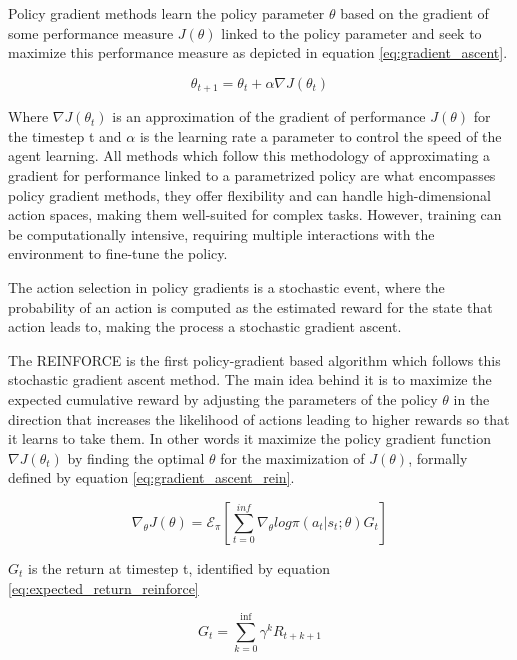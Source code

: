 Policy gradient methods learn the policy parameter $\theta$ based on the gradient of some performance measure $J(\theta)$ linked to the policy parameter and seek to maximize this performance measure as depicted in equation \ref{eq:gradient_ascent}.

\begin{equation}
    \label{eq:gradient_ascent}
    \theta_{t+1} = \theta_t + \alpha \nabla J (\theta_t)
\end{equation}

Where $\nabla J (\theta_t)$ is an approximation of the gradient of performance $J(\theta)$ for the timestep t and $\alpha$ is the learning rate a parameter to control the speed of the agent learning. All methods which follow this methodology of approximating a gradient for performance linked to a parametrized policy are what encompasses policy gradient methods, they offer flexibility and can handle high-dimensional action spaces, making them well-suited for complex tasks. However, training can be computationally intensive, requiring multiple interactions with the environment to fine-tune the policy.

The action selection in policy gradients is a stochastic event, where the probability of an action is computed as the estimated reward for the state that action leads to, making the process a stochastic gradient ascent.

The REINFORCE \cite{sutton} is the first policy-gradient based algorithm which follows this stochastic gradient ascent method. The main idea behind it is to maximize the expected cumulative reward by adjusting the parameters of the policy $\theta$ in the direction that increases the likelihood of actions leading to higher rewards so that it learns to take them. In other words it maximize the policy gradient function $\nabla J (\theta_t)$ by finding the optimal $\theta$ for the maximization of $J(\theta)$, formally defined by equation \ref{eq:gradient_ascent_rein}.

\begin{equation}
    \label{eq:gradient_ascent_rein}
    \nabla_\theta J(\theta) = \mathcal{E}_\pi[\sum_{t=0}^{inf}\nabla_\theta log \pi(a_t|s_t;\theta)G_t]
\end{equation}

$G_t$ is the return at timestep t, identified by equation \ref{eq:expected_return_reinforce}

\begin{equation}
    \label{eq:expected_return_reinforce}
    G_t = \sum_{k=0}^{\inf} \gamma^k R_{t+k+1}
\end{equation}

